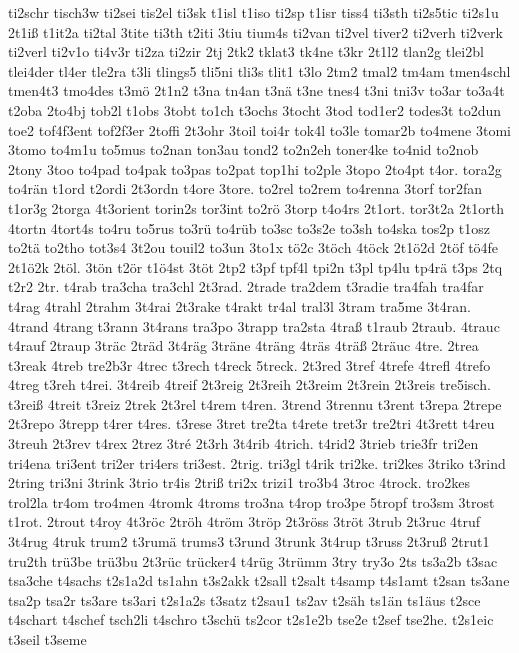 {ti2schr
tisch3w
ti2sei
tis2el
ti3sk
t1isl
t1iso
ti2sp
t1isr
tiss4
ti3sth
ti2s5tic
ti2s1u
2t1iß
t1it2a
ti2tal
3tite
ti3th
t2iti
3tiu
tium4s
ti2van
ti2vel
tiver2
ti2verh
ti2verk
ti2verl
ti2v1o
ti4v3r
ti2za
ti2zir
2tj
2tk2
tklat3
tk4ne
t3kr
2t1l2
tlan2g
tlei2bl
tlei4der
tl4er
tle2ra
t3li
tlings5
tli5ni
tli3s
tlit1
t3lo
2tm2
tmal2
tm4am
tmen4schl
tmen4t3
tmo4des
t3mö
2t1n2
t3na
tn4an
t3nä
t3ne
tnes4
t3ni
tni3v
to3ar
to3a4t
t2oba
2to4bj
tob2l
t1obs
3tobt
to1ch
t3ochs
3tocht
3tod
tod1er2
todes3t
to2dun
toe2
tof4f3ent
tof2f3er
2toffi
2t3ohr
3toil
toi4r
tok4l
to3le
tomar2b
to4mene
3tomi
3tomo
to4m1u
to5mus
to2nan
ton3au
tond2
to2n2eh
toner4ke
to4nid
to2nob
2tony
3too
to4pad
to4pak
to3pas
to2pat
top1hi
to2ple
3topo
2to4pt
t4or.
tora2g
to4rän
t1ord
t2ordi
2t3ordn
t4ore
3tore.
to2rel
to2rem
to4renna
3torf
tor2fan
t1or3g
2torga
4t3orient
torin2s
tor3int
to2rö
3torp
t4o4rs
2t1ort.
tor3t2a
2t1orth
4tortn
4tort4s
to4ru
to5rus
to3rü
to4rüb
to3sc
to3s2e
to3sh
to4ska
tos2p
t1osz
to2tä
to2tho
tot3s4
3t2ou
touil2
to3un
3to1x
tö2c
3töch
4töck
2t1ö2d
2töf
tö4fe
2t1ö2k
2töl.
3tön
t2ör
t1ö4st
3töt
2tp2
t3pf
tpf4l
tpi2n
t3pl
tp4lu
tp4rä
t3ps
2tq
t2r2
2tr.
t4rab
tra3cha
tra3chl
2t3rad.
2trade
tra2dem
t3radie
tra4fah
tra4far
t4rag
4trahl
2trahm
3t4rai
2t3rake
t4rakt
tr4al
tral3l
3tram
tra5me
3t4ran.
4trand
4trang
t3rann
3t4rans
tra3po
3trapp
tra2sta
4traß
t1raub
2traub.
4trauc
t4rauf
2traup
3träc
2träd
3t4räg
3träne
4träng
4träs
4träß
2träuc
4tre.
2trea
t3reak
4treb
tre2b3r
4trec
t3rech
t4reck
5treck.
2t3red
3tref
4trefe
4trefl
4trefo
4treg
t3reh
t4rei.
3t4reib
4treif
2t3reig
2t3reih
2t3reim
2t3rein
2t3reis
tre5isch.
t3reiß
4treit
t3reiz
2trek
2t3rel
t4rem
t4ren.
3trend
3trennu
t3rent
t3repa
2trepe
2t3repo
3trepp
t4rer
t4res.
t3rese
3tret
tre2ta
t4rete
tret3r
tre2tri
4t3rett
t4reu
3treuh
2t3rev
t4rex
2trez
3tré
2t3rh
3t4rib
4trich.
t4rid2
3trieb
trie3fr
tri2en
tri4ena
tri3ent
tri2er
tri4ers
tri3est.
2trig.
tri3gl
t4rik
tri2ke.
tri2kes
3triko
t3rind
2tring
tri3ni
3trink
3trio
tr4is
2triß
tri2x
trizi1
tro3b4
3troc
4trock.
tro2kes
trol2la
tr4om
tro4men
4tromk
4troms
tro3na
t4rop
tro3pe
5tropf
tro3sm
3trost
t1rot.
2trout
t4roy
4t3röc
2tröh
4tröm
3tröp
2t3röss
3tröt
3trub
2t3ruc
4truf
3t4rug
4truk
trum2
t3rumä
trums3
t3rund
3trunk
3t4rup
t3russ
2t3ruß
2trut1
tru2th
trü3be
trü3bu
2t3rüc
trücker4
t4rüg
3trümm
3try
try3o
2ts
ts3a2b
t3sac
tsa3che
t4sachs
t2s1a2d
ts1ahn
t3s2akk
t2sall
t2salt
t4samp
t4s1amt
t2san
ts3ane
tsa2p
tsa2r
ts3are
ts3ari
t2s1a2s
t3satz
t2sau1
ts2av
t2säh
ts1än
ts1äus
t2sce
t4schart
t4schef
tsch2li
t4schro
t3schü
ts2cor
t2s1e2b
tse2e
t2sef
tse2he.
t2s1eic
t3seil
t3seme
}
